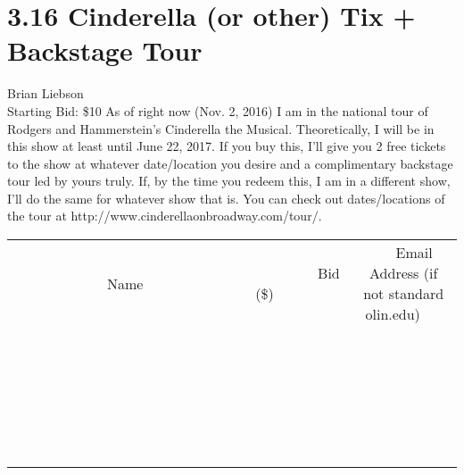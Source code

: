 \documentclass[11pt]{article}
\begin{document}
\section*{3.16 Cinderella (or other) Tix + Backstage Tour}
Brian Liebson
\\
Starting Bid: \$10
\newline
As of right now (Nov. 2, 2016) I am in the national tour of Rodgers and Hammerstein's Cinderella the Musical. Theoretically, I will be in this show at least until June 22, 2017. If you buy this, I'll give you 2 free tickets to the show at whatever date/location you desire and a complimentary backstage tour led by yours truly. If, by the time you redeem this, I am in a different show, I'll do the same for whatever show that is. You can check out dates/locations of the tour at http://www.cinderellaonbroadway.com/tour/.
\\[6ex]
\begin{tabular}{c c c}
~~~~~~~~~~~~~Name~~~~~~~~~~~~~ & ~~~~~~~~~Bid (\$)~~~~~~~~~  & ~~~Email Address (if not standard olin.edu)~~~\\
 & & \\
\hline
 & & \\
\hline
 & & \\
\hline
 & & \\
\hline
 & & \\
\hline
 & & \\
\hline
 & & \\
\hline
 & & \\
\hline
 & & \\
\hline
 & & \\
\hline
 & & \\
\hline
 & & \\
\hline
 & & \\
\hline
 & & \\
\hline
 & & \\
\hline
 & & \\
\hline
 & & \\
\hline
 & & \\
\hline
 & & \\
\hline
 & & \\
\hline
 & & \\
\hline
 & & \\
\hline
 & & \\
\hline
 & & \\
\hline
 & & \\
\hline
 & & \\
\hline
\end{tabular}
\newpage
\end{document}
